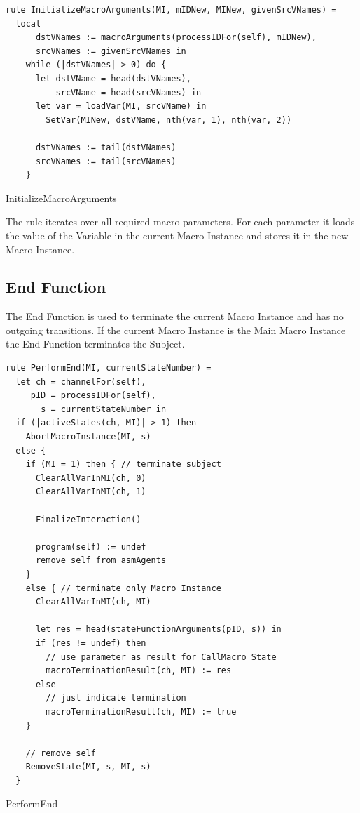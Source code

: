 \begin{listing}[htbp]
\begin{verbatim}
rule InitializeMacroArguments(MI, mIDNew, MINew, givenSrcVNames) =
  local
      dstVNames := macroArguments(processIDFor(self), mIDNew),
      srcVNames := givenSrcVNames in
    while (|dstVNames| > 0) do {
      let dstVName = head(dstVNames),
          srcVName = head(srcVNames) in
      let var = loadVar(MI, srcVName) in
        SetVar(MINew, dstVName, nth(var, 1), nth(var, 2))

      dstVNames := tail(dstVNames)
      srcVNames := tail(srcVNames)
    }
\end{verbatim}
\caption{InitializeMacroArguments}
\label{lst:shortasm:InitializeMacroArguments}
\end{listing}


The  rule iterates over all required macro
parameters. For each parameter it loads the value of the Variable in the current Macro Instance and stores it in the
new Macro Instance.




\subsection{End Function}

The End Function is used to terminate the current Macro Instance and has no outgoing transitions.
If the current Macro Instance is the Main Macro Instance the End Function terminates the Subject.


\begin{listing}[htbp]
\begin{verbatim}
rule PerformEnd(MI, currentStateNumber) =
  let ch = channelFor(self),
     pID = processIDFor(self),
       s = currentStateNumber in
  if (|activeStates(ch, MI)| > 1) then
    AbortMacroInstance(MI, s)
  else {
    if (MI = 1) then { // terminate subject
      ClearAllVarInMI(ch, 0)
      ClearAllVarInMI(ch, 1)

      FinalizeInteraction()

      program(self) := undef
      remove self from asmAgents
    }
    else { // terminate only Macro Instance
      ClearAllVarInMI(ch, MI)

      let res = head(stateFunctionArguments(pID, s)) in
      if (res != undef) then
        // use parameter as result for CallMacro State
        macroTerminationResult(ch, MI) := res
      else
        // just indicate termination
        macroTerminationResult(ch, MI) := true
    }

    // remove self
    RemoveState(MI, s, MI, s)
  }
\end{verbatim}
\caption{PerformEnd}
\label{lst:shortasm:PerformEnd}
\end{listing}


